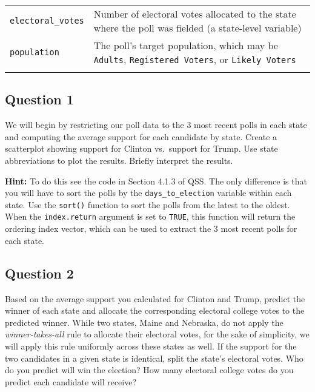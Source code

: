 \documentclass[]{article}
\begin{document}
\begin{longtable}[c]{@{}ll@{}}
\begin{minipage}[t]{0.24\columnwidth}
\texttt{electoral\_votes}
\end{minipage} & \begin{minipage}[t]{0.70\columnwidth}\raggedright
Number of electoral votes allocated to the state where the poll was
fielded (a state-level variable)
\end{minipage}
\\\addlinespace
\begin{minipage}[t]{0.24\columnwidth}\raggedright
\texttt{population}
\end{minipage} & \begin{minipage}[t]{0.70\columnwidth}\raggedright
The poll's target population, which may be \texttt{Adults},
\texttt{Registered Voters}, or \texttt{Likely Voters}
\end{minipage}
\\\addlinespace
\bottomrule
\end{longtable}

\subsection{Question 1}\label{question-1}

We will begin by restricting our poll data to the 3 most recent polls in
each state and computing the average support for each candidate by
state. Create a scatterplot showing support for Clinton vs.~support for
Trump. Use state abbreviations to plot the results. Briefly interpret
the results.

\textbf{Hint:} To do this see the code in Section 4.1.3 of QSS. The only
difference is that you will have to sort the polls by the
\texttt{days\_to\_election} variable within each state. Use the
\texttt{sort()} function to sort the polls from the latest to the
oldest. When the \texttt{index.return} argument is set to \texttt{TRUE},
this function will return the ordering index vector, which can be used
to extract the 3 most recent polls for each state.

\subsection{Question 2}\label{question-2}

Based on the average support you calculated for Clinton and Trump,
predict the winner of each state and allocate the corresponding
electoral college votes to the predicted winner. While two states, Maine
and Nebraska, do not apply the \emph{winner-takes-all} rule to allocate
their electoral votes, for the sake of simplicity, we will apply this
rule uniformly across these states as well. If the support for the two
candidates in a given state is identical, split the state's electoral
votes. Who do you predict will win the election? How many electoral
college votes do you predict each candidate will receive?
\end{document}
